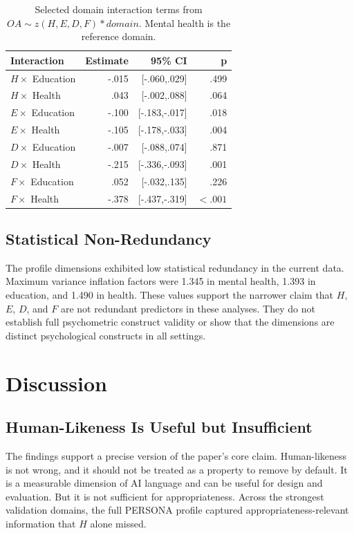 \documentclass[manuscript,review,anonymous]{acmart}
\begin{document}
\begin{table}
\caption{Selected domain interaction terms from $OA \sim z(H,E,D,F) * domain$. Mental health is the reference domain.}
\label{tab:interactions}
\begin{tabular}{lrrr}
\toprule
Interaction & Estimate & 95\% CI & p \\
\midrule
$H \times$ Education & -.015 & [-.060,.029] & .499 \\
$H \times$ Health & .043 & [-.002,.088] & .064 \\
$E \times$ Education & -.100 & [-.183,-.017] & .018 \\
$E \times$ Health & -.105 & [-.178,-.033] & .004 \\
$D \times$ Education & -.007 & [-.088,.074] & .871 \\
$D \times$ Health & -.215 & [-.336,-.093] & .001 \\
$F \times$ Education & .052 & [-.032,.135] & .226 \\
$F \times$ Health & -.378 & [-.437,-.319] & $<.001$ \\
\bottomrule
\end{tabular}
\end{table}

\subsection{Statistical Non-Redundancy}
The profile dimensions exhibited low statistical redundancy in the current data. Maximum variance inflation factors were 1.345 in mental health, 1.393 in education, and 1.490 in health. These values support the narrower claim that $H$, $E$, $D$, and $F$ are not redundant predictors in these analyses. They do not establish full psychometric construct validity or show that the dimensions are distinct psychological constructs in all settings.

\section{Discussion}
\subsection{Human-Likeness Is Useful but Insufficient}
The findings support a precise version of the paper's core claim. Human-likeness is not wrong, and it should not be treated as a property to remove by default. It is a measurable dimension of AI language and can be useful for design and evaluation. But it is not sufficient for appropriateness. Across the strongest validation domains, the full PERSONA profile captured appropriateness-relevant information that $H$ alone missed.
\end{document}
